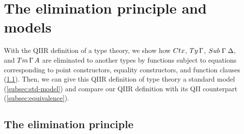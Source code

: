\documentclass[a4paper,UKenglish,numberwithinsect,cleveref,thm-restate]{lipics-v2021}
\newcommand{\LT}[2][]{\todo[inline,author={L-T},caption={},color={pink},#1]{#2}}
\begin{document}

\section{The elimination principle and models} \label{sec:models}

With the QIIR definition of a type theory, we show how $\Ctx$, $\Ty\,\Gamma$, $\Sub\;\Gamma\;\Delta$, and $\Tm\,\Gamma\,A$ are eliminated to another types by functions subject to equations corresponding to point constructors, equality constructors, and function clauses (\cref{subsec:eliminator}).
Then, we can give this QIIR definition of type theory a standard model (\cref{subsec:std-model}) and compare our QIIR definition with its QII counterpart (\cref{subsec:equivalence}).

\subsection{The elimination principle} \label{subsec:eliminator}
\end{document}
